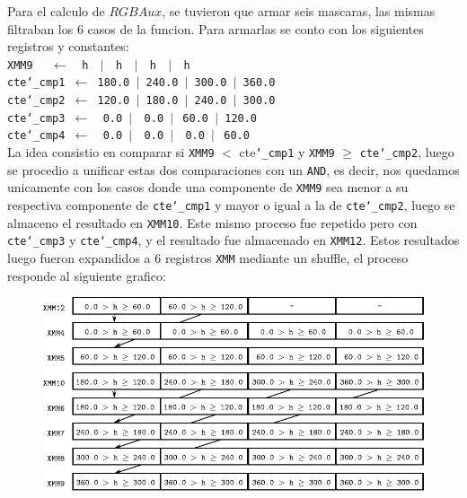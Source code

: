 Para el calculo de $RGBAux$, se tuvieron que armar seis mascaras, las mismas filtraban los 6 casos de la funcion. Para armarlas se conto con los siguientes registros y constantes:\\

\noindent
\texttt{XMM9 $\ \ \ \ \gets\ \ $ h $\ \ \vert\ \ $ h $\ \ \vert\ \ $ h $\ \ \vert\ \ $ h}\\
\texttt{cte\char`_cmp1 $\gets$ 180.0 $\vert$ 240.0 $\vert$ 300.0 $\vert$ 360.0}\\
\texttt{cte\char`_cmp2 $\gets$ 120.0 $\vert$ 180.0 $\vert$ 240.0 $\vert$ 300.0}\\
\texttt{cte\char`_cmp3 $\gets\ \ $ 0.0 $\vert\ \ $ 0.0 $\vert\ $ 60.0 $\vert$ 120.0}\\
\texttt{cte\char`_cmp4 $\gets\ \ $ 0.0 $\vert\ \ $ 0.0 $\vert\ \ $ 0.0 $\vert\ $ 60.0}\\

La idea consistio en comparar si \texttt{XMM9} $<$ cte\texttt{\char`_cmp1} y \texttt{XMM9} $\geq$ \texttt{cte\char`_cmp2}, luego se procedio a unificar estas dos comparaciones con un \texttt{AND}, es decir, nos quedamos unicamente con los casos donde una componente de \texttt{XMM9} sea menor a su respectiva componente de \texttt{cte\char`_cmp1} y mayor o igual a la de \texttt{cte\char`_cmp2}, luego se almaceno el resultado en \texttt{XMM10}. Este mismo proceso fue repetido pero con \texttt{cte\char`_cmp3} y \texttt{cte\char`_cmp4}, y el resultado fue almacenado en \texttt{XMM12}. Estos resultados luego fueron expandidos a 6 registros \texttt{XMM} mediante un shuffle, el proceso responde al siguiente grafico:\\

\newpage
\begin{figure}[!h]
	\centering
	\includegraphics[scale=1.25]{images/HSLASM1_2}
\end{figure}

